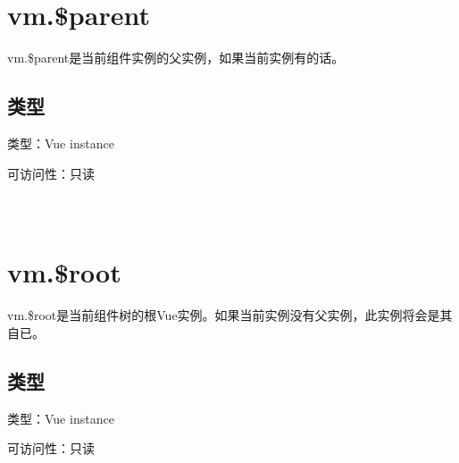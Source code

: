 \begin{lstlisting}[language=JavaScript]

\end{lstlisting}




\section{vm.\$parent}

vm.\$parent是当前组件实例的父实例，如果当前实例有的话。

\subsection{类型}

\begin{compactitem}
\item 类型：Vue instance
\item 可访问性：只读
\end{compactitem}



\begin{lstlisting}[language=JavaScript]

\end{lstlisting}




\begin{lstlisting}[language=JavaScript]

\end{lstlisting}




\begin{lstlisting}[language=JavaScript]

\end{lstlisting}



\section{vm.\$root}

vm.\$root是当前组件树的根Vue实例。如果当前实例没有父实例，此实例将会是其自已。


\subsection{类型}

\begin{compactitem}
\item 类型：Vue instance
\item 可访问性：只读
\end{compactitem}



